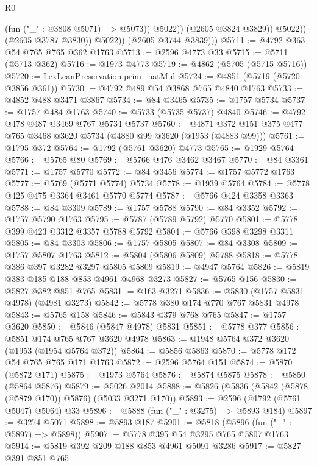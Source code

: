 \begin{lexlean}{R0}
\begin{coremodule}
                          (fun ("_" : @3808 @5071) => @5073))
                        @5022))
                    (@2605 @3824 @3829))
                  @5022))
              (@2605 @3787 @3830))
            @5022))
        (@2605 @3744 @3839)))
@5711 := @4792 @363 @54 @765 @765 @362 @1763
@5713 := @2596 @4773 @33
@5715 := @5711 (@5713 @362)
@5716 := @1973 @4773
@5719 := @4862 (@5705 (@5715 @5716))
@5720 := LexLeanPreservation.prim_natMul
@5724 := @4851 (@5719 (@5720 @3856 @361))
@5730 := @4792 @489 @54 @3868 @765 @4840 @1763
@5733 := @4852 @488 @3471 @3867
@5734 := @84 @3465
@5735 := @1757 @5734
@5737 := @1757 @484 @1763
@5740 := @5733 (@5735 @5737) @4840
@5746 := @4792 @478 @487 @3469 @767 @5734 @5737
@5760 := @4871 @372 @151 @375 @477 @765 @3468 @3620 @5734 (@4880 @99 @3620 (@1953 (@4883 @99)))
@5761 := @1795 @372
@5764 := @1792 (@5761 @3620) @4773
@5765 := @1929 @5764
@5766 := @5765 @80
@5769 := @5766 @476 @3462 @3467
@5770 := @84 @3361
@5771 := @1757 @5770
@5772 := @84 @3456
@5774 := @1757 @5772 @1763
@5777 := @5769 (@5771 @5774) @5734
@5778 := @1939 @5764
@5784 := @5778 @425 @475 @3364 @3461 @5770 @5774
@5787 := @5766 @424 @3358 @3363
@5788 := @84 @3309
@5789 := @1757 @5788
@5790 := @84 @3352
@5792 := @1757 @5790 @1763
@5795 := @5787 (@5789 @5792) @5770
@5801 := @5778 @399 @423 @3312 @3357 @5788 @5792
@5804 := @5766 @398 @3298 @3311
@5805 := @84 @3303
@5806 := @1757 @5805
@5807 := @84 @3308
@5809 := @1757 @5807 @1763
@5812 := @5804 (@5806 @5809) @5788
@5818 := @5778 @386 @397 @3282 @3297 @5805 @5809
@5819 := @4947 @5764
@5826 := @5819 @383 @185 @188 @853 @4961 @4968 @3273
@5827 := @5765 @156
@5830 := @5827 @382 @851 @765
@5831 := @163 @3271
@5836 := @5830 (@1757 @5831 @4978) (@4981 @3273)
@5842 := @5778 @380 @174 @770 @767 @5831 @4978
@5843 := @5765 @158
@5846 := @5843 @379 @768 @765
@5847 := @1757 @3620
@5850 := @5846 (@5847 @4978) @5831
@5851 := @5778 @377
@5856 := @5851 @174 @765 @767 @3620 @4978
@5863 := @1948 @5764 @372 @3620 (@1953 (@1954 @5764 @372))
@5864 := @5856 @5863
@5870 := @5778 @172 @54 @765 @765 @171 @1763
@5872 := @2596 @5764 @151
@5874 := @5870 (@5872 @171)
@5875 := @1973 @5764
@5876 := @5874 @5875
@5878 := @5850 (@5864 @5876)
@5879 := @5026 @2014
@5888 := @5826 (@5836 (@5842 (@5878 (@5879 @170)) @5876) (@5033 @3271 @170))
@5893 := @2596 (@1792 (@5761 @5047) @5064) @33
@5896 := @5888 (fun ("_" : @3275) => @5893 @184)
@5897 := @3274 @5071
@5898 := @5893 @187
@5901 := @5818 (@5896 (fun ("_" : @5897) => @5898))
@5907 := @5778 @395 @54 @3295 @765 @5807 @1763
@5914 := @5819 @392 @209 @188 @853 @4961 @5091 @3286
@5917 := @5827 @391 @851 @765

\end{coremodule}
\end{lexlean}
